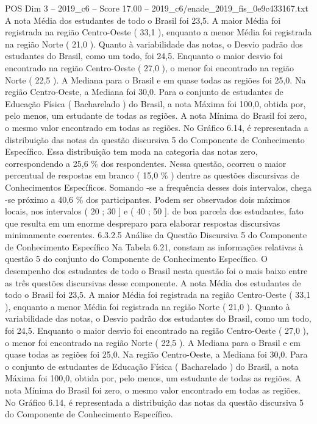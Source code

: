 \begin{textsample}{POS Dim 3 – 2019\_c6 – Score 17.00 – 2019\_c6/enade\_2019\_fis\_0e9c433167.txt}
A nota Média dos estudantes de todo o Brasil foi 23,5.
A maior Média foi registrada na região Centro-Oeste ( 33,1 ), enquanto a menor Média foi registrada na região Norte ( 21,0 ).
Quanto à variabilidade das notas, o Desvio padrão dos estudantes do Brasil, como um todo, foi 24,5.
Enquanto o maior desvio foi encontrado na região Centro-Oeste ( 27,0 ), o menor foi encontrado na região Norte ( 22,5 ).
A Mediana para o Brasil e em quase todas as regiões foi 25,0.
Na região Centro-Oeste, a Mediana foi 30,0.
Para o conjunto de estudantes de Educação Física ( Bacharelado ) do Brasil, a nota Máxima foi 100,0, obtida por, pelo menos, um estudante de todas as regiões.
A nota Mínima do Brasil foi zero, o mesmo valor encontrado em todas as regiões.
No Gráfico 6.14, é representada a distribuição das notas da questão discursiva 5 do Componente de Conhecimento Específico.
Essa distribuição tem moda na categoria das notas zero, correspondendo a 25,6 \% dos respondentes.
Nessa questão, ocorreu o maior percentual de respostas em branco ( 15,0 \% ) dentre as questões discursivas de Conhecimentos Específicos.
Somando -se a frequência desses dois intervalos, chega -se próximo a 40,6 \% dos participantes.
Podem ser observados dois máximos locais, nos intervalos ( 20 ; 30 ] e ( 40 ; 50 ]. de boa parcela dos estudantes, fato que resulta em um enorme despreparo para elaborar respostas discursivas minimamente coerentes. 6.3.2.5 Análise da Questão Discursiva 5 do Componente de Conhecimento Específico Na Tabela 6.21, constam as informações relativas à questão 5 do conjunto do Componente de Conhecimento Específico.
O desempenho dos estudantes de todo o Brasil nesta questão foi o mais baixo entre as três questões discursivas desse componente.
A nota Média dos estudantes de todo o Brasil foi 23,5.
A maior Média foi registrada na região Centro-Oeste ( 33,1 ), enquanto a menor Média foi registrada na região Norte ( 21,0 ).
Quanto à variabilidade das notas, o Desvio padrão dos estudantes do Brasil, como um todo, foi 24,5.
Enquanto o maior desvio foi encontrado na região Centro-Oeste ( 27,0 ), o menor foi encontrado na região Norte ( 22,5 ).
A Mediana para o Brasil e em quase todas as regiões foi 25,0.
Na região Centro-Oeste, a Mediana foi 30,0.
Para o conjunto de estudantes de Educação Física ( Bacharelado ) do Brasil, a nota Máxima foi 100,0, obtida por, pelo menos, um estudante de todas as regiões.
A nota Mínima do Brasil foi zero, o mesmo valor encontrado em todas as regiões.
No Gráfico 6.14, é representada a distribuição das notas da questão discursiva 5 do Componente de Conhecimento Específico.

\end{textsample}
